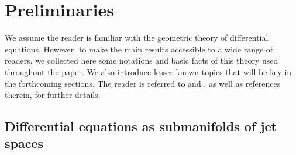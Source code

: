 \documentclass[12pt,english]{elsarticle}
\theoremstyle{plain}
\theoremstyle{plain}
\theoremstyle{remark}
\theoremstyle{plain}
\theoremstyle{definition}
\theoremstyle{definition}
\begin{document}

\section{Preliminaries}
\label{sec:Preliminaries}

We assume the reader is familiar with the geometric theory of differential
equations. However, to make the main results accessible to a wide range
of readers, we collected here some notations and basic facts of this theory
used throughout the paper. We also introduce lesser-known topics that will
be key in the forthcoming sections. The reader is referred to
\cite{B_KrV,KLV,olver,Stormark} and
\cite{And-Ibr,DiegoLuiz,Dun,Ibragimov,Marvan1,Tesi_Luiz,Sokolov}, as well
as references therein, for further details.

\subsection{Differential equations as submanifolds of jet spaces}
\label{subsec:Jet-spaces-and}
\end{document}
